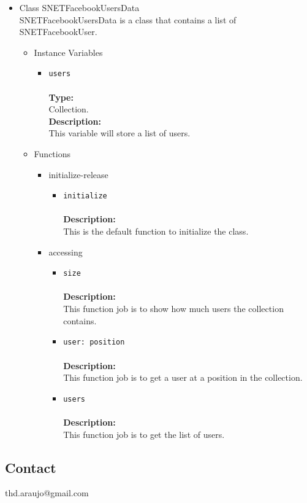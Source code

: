 \begin{itemize}
\begin{itemize}
\begin{itemize}
\end{itemize} %
\end{itemize} %

\item Class SNETFacebookUsersData\\
\label{sec-1-4-2-14}%
SNETFacebookUsersData is a class that contains a list of SNETFacebookUser.

\begin{itemize}

\item Instance Variables
\label{sec-1-4-2-14-1}%
\begin{itemize}
\item \verb~users~\\\\
\textbf{Type:}\\
     Collection.\\

     \textbf{Description:}\\
     This variable will store a list of users.
\end{itemize}


\item Functions
\label{sec-1-4-2-14-2}%
\begin{itemize}

\item initialize-release
\label{sec-1-4-2-14-2-1}%
\begin{itemize}
\item \verb~initialize~\\\\
\textbf{Description:}\\
      This is the default function to initialize the class.
\end{itemize}


\item accessing
\label{sec-1-4-2-14-2-2}%
\begin{itemize}
\item \verb~size~\\\\
\textbf{Description:}\\
      This function job is to show how much users the collection contains.\\
\item \verb~user: position~\\\\
\textbf{Description:}\\
      This function job is to get a user at a position in the collection.\\
\item \verb~users~\\\\
\textbf{Description:}\\
      This function job is to get the list of users.
\end{itemize}

\end{itemize} %
\end{itemize} %
\end{itemize} %
\subsection{Contact}
\label{sec-1-5}

  thd.araujo@gmail.com
